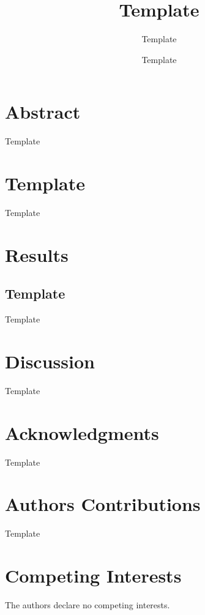 \documentclass[hidelinks,11pt]{article}
\date{}
\title{Template}
\author[1,2]{Template}
\author[1,3]{Template}
\affil[1]{Template}
\affil[2]{Template}
\affil[3]{Template}
\affil[ ]{\href{mailto:template}{email:template}}
\begin{document}

\maketitle

\begin{refsegment}

\section*{Abstract}

Template

\section*{Template}

Template

\section*{Results}

\subsection*{Template}

Template

\section*{Discussion}

Template

\section*{Acknowledgments}

Template

\section*{Authors Contributions}

Template

\section*{Competing Interests}

The authors declare no competing interests.

\clearpage

\end{refsegment}
\printbibliography[segment=1]
\end{document}
